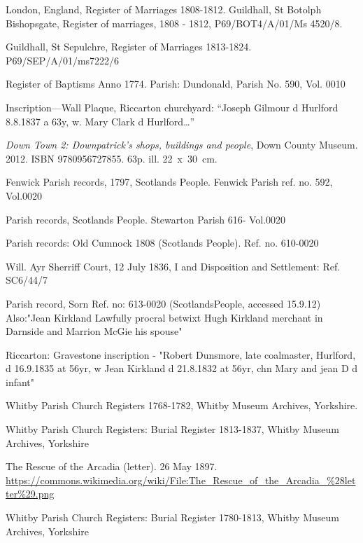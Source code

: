 \begin{thebibliography}{99}
	 London, England, Register of Marriages 1808-1812.
	 Guildhall, St Botolph Bishopsgate, Register of marriages, 1808 - 1812, P69/BOT4/A/01/Ms 4520/8.
	 
	 Guildhall, St Sepulchre, Register of Marriages 1813-1824. P69/SEP/A/01/ms7222/6
	 
	 Register of Baptisms Anno 1774. Parish: Dundonald, Parish No. 590, Vol. 0010

	Inscription---Wall Plaque, Riccarton churchyard:
	``Joseph Gilmour d Hurlford 8.8.1837 a 63y, w. Mary Clark d Hurlford\dots''

	\emph{Down Town 2: Downpatrick's shops, buildings and people}, Down County Museum.
	2012. ISBN 9780956727855. 63p. ill. 22~x~30~cm.

	Fenwick Parish records, 1797, Scotlands People. Fenwick Parish ref. no. 592, Vol.0020

	Parish records, Scotlands People. Stewarton Parish 616- Vol.0020
	
	Parish records: Old Cumnock 1808 (Scotlands People). Ref. no. 610-0020
	
	 Will. Ayr Sherriff Court, 12 July 1836, I and Disposition and Settlement: Ref. SC6/44/7
	 
	Parish record, Sorn Ref. no: 613-0020 (ScotlandsPeople, accessed 15.9.12)
	Also:"Jean Kirkland Lawfully procral betwixt Hugh Kirkland merchant in Darnside and Marrion McGie his 			spouse"
	
	Riccarton: Gravestone inscription - "Robert Dunsmore, late coalmaster, Hurlford, d 16.9.1835 at 56yr,
	w Jean Kirkland d 21.8.1832 at 56yr, chn Mary and jean D d infant"

	Whitby Parish Church Registers 1768-1782, Whitby Museum Archives, Yorkshire.

	Whitby Parish Church Registers: Burial Register 1813-1837, Whitby Museum Archives, Yorkshire

	The Rescue of the Arcadia (letter). 26 May 1897.
	\url{https://commons.wikimedia.org/wiki/File:The_Rescue_of_the_Arcadia_\%28letter\%29.png}

	Whitby Parish Church Registers: Burial Register 1780-1813, Whitby Museum Archives, Yorkshire


\end{thebibliography}
